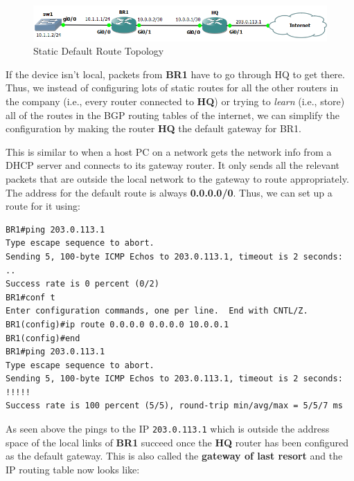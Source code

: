 \begin{figure}[H]
\centering
\includegraphics[width=0.9\linewidth]{"ICND1/2. Routers/chapters/3.1.c Static Default Route"}
\caption{Static Default Route Topology}
\label{fig:9.1.c}
\end{figure}

\noindent
If the device isn't local, packets from \textbf{BR1} have to go through HQ to get there. Thus, we instead of configuring lots of static routes for all the other routers in the company (i.e., every router connected to \textbf{HQ}) or trying to \textit{learn} (i.e., store) all of the routes in the BGP routing tables of the internet, we can simplify the configuration by making the router \textbf{HQ} the default gateway for BR1. 

This is similar to when a host PC on a network gets the network info from a DHCP server and connects to its gateway router. It only sends all the relevant packets that are outside the local network to the gateway to route appropriately. The address for the default route is always \textbf{0.0.0.0/0}. Thus, we can set up a route for it using:

\vspace{-15pt}
\begin{verbatim}
BR1#ping 203.0.113.1
Type escape sequence to abort.
Sending 5, 100-byte ICMP Echos to 203.0.113.1, timeout is 2 seconds:
..
Success rate is 0 percent (0/2)
BR1#conf t 
Enter configuration commands, one per line.  End with CNTL/Z.
BR1(config)#ip route 0.0.0.0 0.0.0.0 10.0.0.1
BR1(config)#end
BR1#ping 203.0.113.1
Type escape sequence to abort.
Sending 5, 100-byte ICMP Echos to 203.0.113.1, timeout is 2 seconds:
!!!!!
Success rate is 100 percent (5/5), round-trip min/avg/max = 5/5/7 ms
\end{verbatim}
\vspace{-10pt}

\noindent
As seen above the pings to the IP \verb|203.0.113.1| which is outside the address space of the local links of \textbf{BR1} succeed once the \textbf{HQ} router has been configured as the default gateway. This is also called the \textbf{gateway of last resort} and the IP routing table now looks like:

